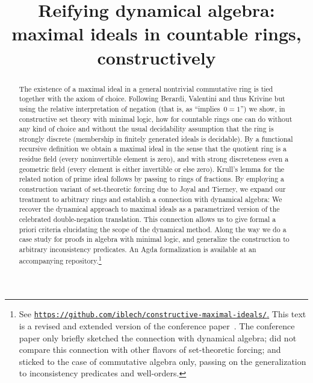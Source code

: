 \documentclass[com,11pt,crcready]{iosart2x}
\theoremstyle{definition}
\theoremstyle{plain}
\theoremstyle{remark}
\renewcommand{\_}{\mathpunct{.}\,}
\begin{document}
\begin{frontmatter}

\title{Reifying dynamical algebra: \\ maximal ideals in countable rings, constructively}

\begin{aug}
\author[A]{
}
\author[B]{
}
\address[A]{Institut für Mathematik, ,
}
\address[B]{Dipartimento di Informatico, ,
}
\end{aug}

\begin{abstract}
  The existence of a maximal ideal in a general nontrivial commutative
  ring is tied together with the axiom of choice.
  Following Berardi, Valentini and thus Krivine but using the relative interpretation of
  negation (that is, as ``implies~$0=1$'') we show, in constructive set theory with
  minimal logic, how for countable rings one can do without any kind of choice
  and without the usual decidability assumption that the ring is strongly
  discrete (membership in finitely generated ideals is decidable).
  By a functional
  recursive definition we obtain a maximal ideal in the sense that the quotient ring is a residue field
  (every noninvertible element is zero), and with strong discreteness
  even a geometric field (every element is either invertible or
  else zero). Krull's lemma for the related notion of prime ideal follows by
  passing to rings of fractions.
  By employing a construction variant of set-theoretic forcing due to Joyal and
  Tierney, we expand our treatment to arbitrary rings and establish a
  connection with dynamical algebra: We
  recover the dynamical approach to maximal ideals as a parametrized version of the
  celebrated double-negation translation. This connection allows us to give formal a priori criteria
  elucidating the scope of the dynamical method.
  Along the way we do a case study for proofs in algebra with minimal logic,
  and generalize the construction to arbitrary inconsistency predicates. An Agda
  formalization is available at an accompanying repository.\footnote{See
  \href{https://github.com/iblech/constructive-maximal-ideals/}{\texttt{https:/$\!$/github.com/iblech/constructive-maximal-ideals/}.}
  This text is a revised and extended version
  of the conference paper~\cite{blechschmidt-schuster:constructive-maximal-ideals}. The conference paper only
  briefly sketched the connection with dynamical algebra; did not compare this
  connection with other flavors of set-theoretic forcing; and sticked to the case
  of commutative algebra only, passing on the generalization to inconsistency predicates
  and well-orders.}
\end{abstract}


\end{frontmatter}
\end{document}
